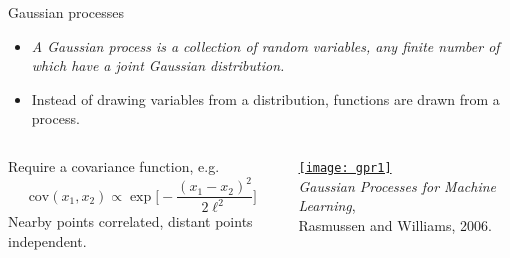 \documentclass{beamer}
\begin{document}
\begin{frame}[label=gp]{Gaussian processes}


  \begin{itemize}
    \item \emph{A Gaussian process is a collection of random variables, any finite number of which have a joint Gaussian distribution.}
    \item Instead of drawing variables from a distribution, functions are drawn from a process.
  \end{itemize}



  \begin{columns}[c]
    Require a covariance function, e.g.
    \begin{equation*}
      \text{cov}(x_1,x_2) \propto \exp \biggl[ -\frac{(x_1 - x_2)^2}{2\ell^2} \biggr]
    \end{equation*}
    Nearby points correlated, distant points independent.

    \hyperlink{gengp}{\texttt{[image: gpr1]}} \\[1ex]
    \raggedleft\tiny \emph{Gaussian Processes for Machine Learning}, \\ Rasmussen and Williams, 2006.
  \end{columns}

\end{frame}
\end{document}
